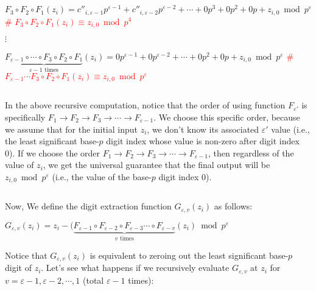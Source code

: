 $ $

 $F_{3} \circ F_{2} \circ F_{1}(z_i) = c''_{i,\varepsilon-1}p^{\varepsilon-1} + c''_{i,\varepsilon-2}p^{\varepsilon-2} + \cdots + 0p^3 + 0p^2 + 0p + z_{i, 0} \bmod p^\varepsilon$  \textcolor{red}{ \# $F_{3} \circ F_{2} \circ F_{1}(z_i) \equiv z_{i,0} \bmod p^4$} 

$\vdots$

 $\underbrace{F_{\varepsilon-1}  \circ \cdots \circ F_{3} \circ F_{2} \circ F_{1}}_{\varepsilon-1 \text{ times}}(z_i) = 0p^{\varepsilon-1} + 0p^{\varepsilon-2} + \cdots + 0p^2 + 0p + z_{i, 0} \bmod p^\varepsilon$ \textcolor{red}{ \# $F_{\varepsilon-1} \cdots F_{3} \circ F_{2} \circ F_{1}(z_i) \equiv z_{i,0} \bmod p^\varepsilon$} 

$ $


In the above recursive computation, notice that the order of using function $F_{\varepsilon'}$ is specifically $F_{1} \rightarrow F_{2} \rightarrow F_{3} \rightarrow \cdots \rightarrow F_{\varepsilon -1}$. We choose this specific order, because we assume that for the initial input $z_i$, we don't know its associated $\varepsilon'$ value (i.e., the least significant base-$p$ digit index whose value is non-zero after digit index 0). If we choose the order $F_{1} \rightarrow F_{2} \rightarrow F_{3} \rightarrow \cdots \rightarrow F_{\varepsilon -1}$, then regardless of the value of $z_i$, we get the universal guarantee that the final output will be $z_{i,0} \bmod p^\varepsilon$ (i.e., the value of the base-$p$ digit index 0).

$ $

Now, We define the digit extraction function $G_{\varepsilon, v}(z_i)$ as follows:

$G_{\varepsilon, v}(z_i) = z_i - (\underbrace{F_{\varepsilon-1}  \circ F_{\varepsilon-2}  \circ F_{\varepsilon-3}  \cdots \circ F_{\varepsilon-v}}_{v \text{ times}}(z_i) \bmod p^\varepsilon$


Notice that $G_{\varepsilon, v}(z_i)$ is equivalent to zeroing out the least significant base-$p$ digit of $z_i$. Let's see what happens if we recursively evaluate $G_{\varepsilon, v}$ at $z_i$ for $v =\varepsilon-1,\varepsilon-2, \cdots, 1$ (total $\varepsilon-1$ times):

